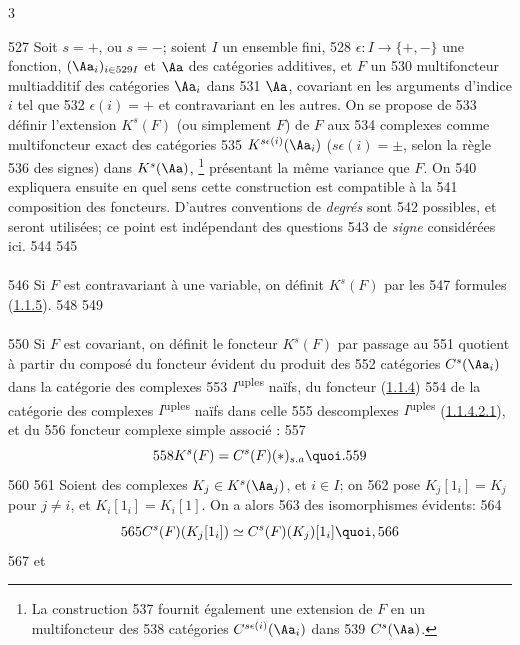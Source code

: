 3	\documentclass[10pt]{../fichiers-configuration-latex/smfart}
\begin{document}
   527	Soit $s=+$, ou $s=-$; soient $I$ un ensemble fini,
   528	$\epsilon:I\rightarrow \{+,-\}$ une fonction, $(\Aa_i)_{i\in
   529	  I}$ et $\Aa$ des catégories additives, et $F$ un
   530	multifoncteur multiadditif des catégories $\Aa_i$ dans
   531	$\Aa$, covariant en les arguments d'indice $i$ tel que
   532	$\epsilon(i)=+$ et contravariant en les autres. On se propose de
   533	définir l'extension $K^{s}(F)$ (ou simplement $F$) de $F$ aux
   534	complexes comme multifoncteur exact des catégories
   535	$K^{s\epsilon(i)}(\Aa_i)$ ($s\epsilon(i)=\pm$, selon la règle
   536	des signes) dans $K^{s}(\Aa)$, \footnote[1]{La construction
   537	  fournit également une extension de $F$ en un multifoncteur des
   538	  catégories $C^{s\epsilon(i)}(\Aa_i)$ dans
   539	  $C^{s}(\Aa)$.} présentant la même variance que $F$. On
   540	expliquera ensuite en quel sens cette construction est compatible à la
   541	composition des foncteurs. D'autres conventions de \emph{degrés} sont
   542	possibles, et seront utilisées; ce point est indépendant des questions
   543	de \emph{signe} considérées ici.
   544	
   545	\paragraph{}
   546	Si $F$ est contravariant à une variable, on définit $K^{s}(F)$ par les
   547	formules (\hyperref[XVII.subsubsec1.1.5]{1.1.5}).
   548	
   549	\paragraph{}
   550	Si $F$ est covariant, on définit le foncteur $K^{s}(F)$ par passage au
   551	quotient à partir du composé du foncteur évident du produit des
   552	catégories $C^{s}(\Aa_i)$ dans la catégorie des complexes
   553	$I$\textsuperscript{uples} naïfs, du foncteur (\hyperref[XVII.subsubsec1.1.4]{1.1.4})
   554	de la catégorie des complexes $I$\textsuperscript{uples} naïfs dans celle
   555	des\pageoriginale complexes $I$\textsuperscript{uples} (\hyperref[XVII.par1.1.4.2.1]{1.1.4.2.1}), et du
   556	foncteur complexe simple associé :
   557	\[
   558	K^{s}(F)=C^{s}(F)(\ast)_{s.a}{\quoi}.
   559	\]
   560	
   561	Soient des complexes $K_j\in K^{s}(\Aa_j)$, et $i\in I$; on
   562	pose $K_j[1_i]=K_j$ pour $j\neq i$, et $K_i[1_i]=K_{i}[1]$. On a alors
   563	des isomorphismes évidents:
   564	\[
   565	C^{s}(F)(K_{j}[1_i])\simeq C^{s}(F)(K_j)[1_i]{\quoi},
   566	\]
   567	et
\end{document}
